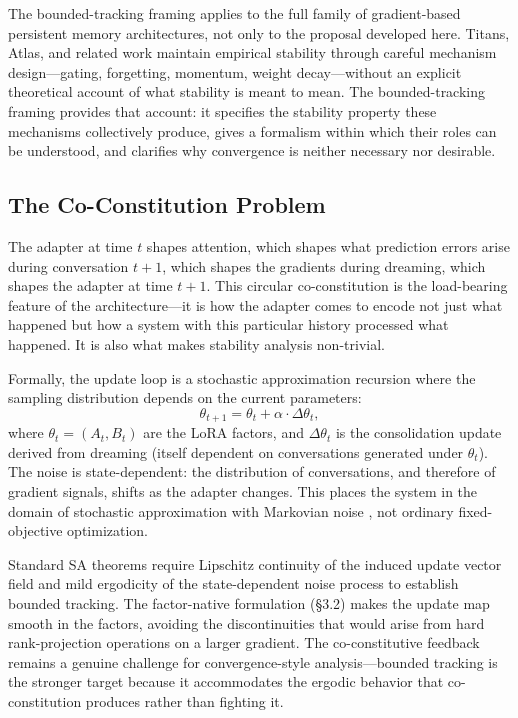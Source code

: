 \documentclass[11pt]{article}
\begin{document}
The bounded-tracking framing applies to the full family of gradient-based persistent memory architectures, not only to the proposal developed here. Titans, Atlas, and related work maintain empirical stability through careful mechanism design---gating, forgetting, momentum, weight decay---without an explicit theoretical account of what stability is meant to mean. The bounded-tracking framing provides that account: it specifies the stability property these mechanisms collectively produce, gives a formalism within which their roles can be understood, and clarifies why convergence is neither necessary nor desirable.

\subsection{The Co-Constitution Problem}

The adapter at time $t$ shapes attention, which shapes what prediction errors arise during conversation $t+1$, which shapes the gradients during dreaming, which shapes the adapter at time $t+1$. This circular co-constitution is the load-bearing feature of the architecture---it is how the adapter comes to encode not just what happened but how a system with this particular history processed what happened. It is also what makes stability analysis non-trivial.

Formally, the update loop is a stochastic approximation recursion where the sampling distribution depends on the current parameters:
\begin{equation}
    \theta_{t+1} = \theta_t + \alpha \cdot \Delta\theta_t,
\end{equation}
where $\theta_t = (A_t, B_t)$ are the LoRA factors, and $\Delta\theta_t$ is the consolidation update derived from dreaming (itself dependent on conversations generated under $\theta_t$). The noise is state-dependent: the distribution of conversations, and therefore of gradient signals, shifts as the adapter changes. This places the system in the domain of stochastic approximation with Markovian noise \cite{borkar2008}, not ordinary fixed-objective optimization.

Standard SA theorems require Lipschitz continuity of the induced update vector field and mild ergodicity of the state-dependent noise process to establish bounded tracking. The factor-native formulation (\S 3.2) makes the update map smooth in the factors, avoiding the discontinuities that would arise from hard rank-projection operations on a larger gradient. The co-constitutive feedback remains a genuine challenge for convergence-style analysis---bounded tracking is the stronger target because it accommodates the ergodic behavior that co-constitution produces rather than fighting it.
\end{document}
